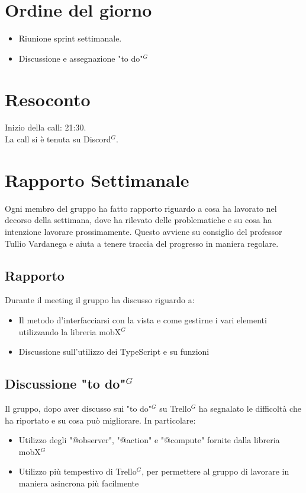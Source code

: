\section{Ordine del giorno}

\begin{itemize}
	\item Riunione sprint settimanale.
    \item Discussione e assegnazione "to do"$^{G}$ 
\end{itemize}

\section{Resoconto}

\noindent
Inizio della call: 21:30. \\
\noindent La call si è tenuta su Discord$^{G}$.
\section{Rapporto Settimanale}
Ogni membro del gruppo ha fatto rapporto riguardo a cosa ha lavorato nel decorso della settimana, dove ha rilevato delle problematiche e su cosa ha intenzione lavorare prossimamente.
Questo avviene su consiglio del professor Tullio Vardanega e aiuta a tenere traccia del progresso in maniera regolare.

\subsection{Rapporto}
Durante il meeting il gruppo ha discusso riguardo a:
\begin{itemize}
	\item Il metodo d'interfacciarsi con la vista e come gestirne i vari elementi utilizzando la libreria mobX$^{G}$
    \item Discussione sull'utilizzo dei TypeScript e su funzioni
\end{itemize}

\subsection{Discussione "to do"$^{G}$}
Il gruppo, dopo aver discusso sui "to do"$^{G}$ su Trello$^{G}$ ha segnalato le difficoltà che ha riportato e su cosa può migliorare. In particolare:
\begin{itemize}
	\item Utilizzo degli "@observer", "@action" e "@compute" fornite dalla libreria mobX$^{G}$
	\item Utilizzo più tempestivo di Trello$^{G}$, per permettere al gruppo di lavorare in maniera asincrona più facilmente
\end{itemize}

